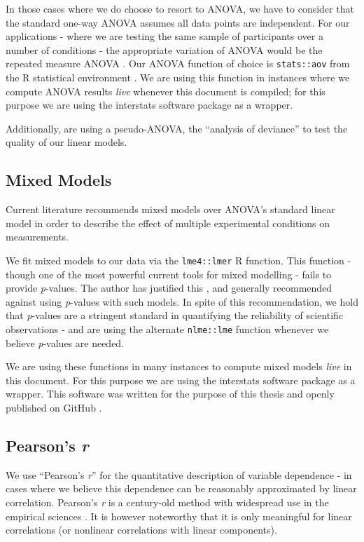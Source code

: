 	    In those cases where we do choose to resort to ANOVA, we have to consider that the standard one-way ANOVA assumes all data points are independent.
	    For our applications - where we are testing the same sample of participants over a number of conditions - the appropriate variation of ANOVA would be the repeated measure ANOVA \citep{Gueorguieva2004}.
	    Our ANOVA function of choice is \colorbox{vlg}{\texttt{stats::aov}} \citep{Chambers1992} from the R statistical environment \citep{R}.
	    We are using this function in instances where we compute ANOVA results \textit{live} whenever this document is compiled; for this purpose we are using the interstats \citep{interstats} software package as a wrapper.
	    
	    Additionally, are using a pseudo-ANOVA, the “analysis of deviance” \citep{Hastie1992} to test the quality of our linear models. 
	\subsection{Mixed Models}\label{sec:m_sa_lm}
	    Current literature \citep{Baayen2008} recommends mixed models over ANOVA's standard linear model in order to describe the effect of multiple experimental conditions on measurements.
	    
	    We fit mixed models to our data via the \colorbox{vlg}{\texttt{lme4::lmer}} \citep{Bates2005,Bates2007} R function.
	    This function - though one of the most powerful current tools for mixed modelling - fails to provide \textit{p}-values.
	    The author has justified this \citep{Bates2006}, and generally recommended against using \textit{p}-values with such models.
	    In spite of this recommendation, we hold that \textit{p}-values are a stringent standard in quantifying the reliability of scientific observations -
	    and are using the alternate \colorbox{vlg}{\texttt{nlme::lme}} \citep{Pinheiro2013} function whenever we believe \textit{p}-values are needed.
	    
	    We are using these functions in many instances to compute mixed models \textit{live} in this document.
	    For this purpose we are using the interstats \citep{interstats} software package as a wrapper.
	    This software was written for the purpose of this thesis and openly published on GitHub \citep{github}.
	\subsection{Pearson's \textit{r}}
	    We use “Pearson's \textit{r}” for the quantitative description of variable dependence - in cases where we believe this dependence can be reasonably approximated by linear correlation.
	    Pearson's \textit{r} is a century-old method with widespread use in the empirical sciences \citep{Stigler1989}.
	    It is however noteworthy that it is only meaningful for linear correlations (or nonlinear correlations with linear components).
	    
